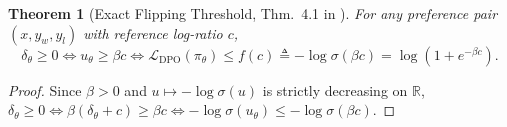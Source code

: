 \documentclass[11pt]{article}
\theoremstyle{plain}
\newtheorem{theorem}{Theorem}[section]
\theoremstyle{definition}
\newcommand{\pitheta}{\pi_{\theta}}
\newcommand{\LDPO}{\mathcal{L}_{\mathrm{DPO}}}
\begin{document}
\begin{theorem}[Exact Flipping Threshold, Thm.~4.1 in \citet{chen2024preference}]
\label{thm:flip_threshold}
For any preference pair $(x, y_w, y_l)$ with reference log-ratio $c$,
\begin{equation}
  \delta_\theta \ge 0
  \iff u_\theta \ge \beta c
  \iff \LDPO(\pitheta) \le f(c) \triangleq -\log \sigma(\beta c) = \log(1 + e^{-\beta c}).
  \label{eq:thm4_1}
\end{equation}
\end{theorem}
\begin{proof}
Since $\beta > 0$ and $u \mapsto -\log \sigma(u)$ is strictly decreasing on $\mathbb{R}$, $\delta_\theta \ge 0 \iff \beta(\delta_\theta + c) \ge \beta c \iff -\log \sigma(u_\theta) \le -\log \sigma(\beta c)$.
\end{proof}
\end{document}
